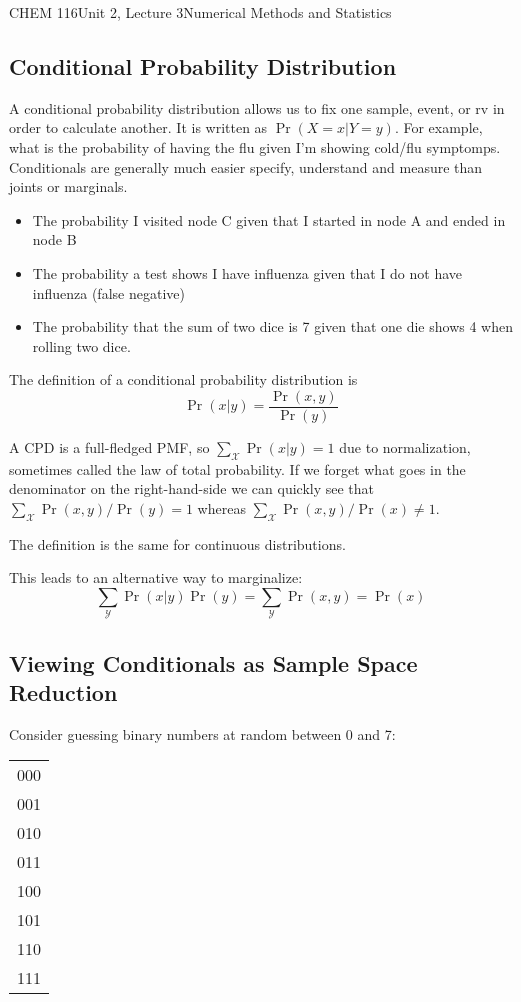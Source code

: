 \documentclass{article}
\begin{document}
\begin{tdoc}{CHEM 116}{Unit 2, Lecture 3}{Numerical Methods and Statistics}
\subsection{Conditional Probability Distribution}
A conditional probability distribution allows us to fix one sample,
event, or rv in order to calculate another. It is written as
$\Pr(X=x|Y=y)$. For example, what is the probability of having the flu
given I'm showing cold/flu symptomps. Conditionals are generally much
easier specify, understand and measure than joints or marginals.

\begin{itemize}
\item The probability I visited node C given that I started in node A and ended in node B
\item The probability a test shows I have influenza given that I do not have influenza (false negative)
\item The probability that the sum of two dice is 7 given that one die shows 4 when rolling two dice.

\end{itemize}

The definition of a conditional probability distribution is
\begin{equation}
\Pr(x|y) = \frac{\Pr(x,y)}{\Pr(y)}
\end{equation}

A CPD is a full-fledged PMF, so $\sum_\mathcal{X} \Pr(x|y) = 1$ due to
normalization, sometimes called the law of total probability.  If we
forget what goes in the denominator on the right-hand-side we can
quickly see that $\sum_\mathcal{X} \Pr(x,y) / \Pr(y) = 1$ whereas
$\sum_\mathcal{X} \Pr(x,y) / \Pr(x) \neq 1$.

The definition is the same for continuous distributions.

This leads to an alternative way to marginalize:
\[
\sum_\mathcal{Y} \Pr(x|y) \Pr(y) = \sum_\mathcal{Y} \Pr(x,y) = \Pr(x)
\]


\subsection{Viewing Conditionals as Sample Space Reduction}

Consider guessing binary numbers at random between 0 and 7:\vspace{0.25cm}

\begin{tabular}{l}
000\\
001\\
010\\
011\\
100\\
101\\
110\\
111\\
\end{tabular}\vspace{0.25cm}


\end{tdoc}
\end{document}
